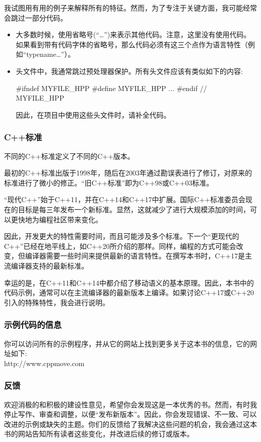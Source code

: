 我试图用有用的例子来解释所有的特征。然而，为了专注于关键方面，我可能经常会跳过一部分代码。

\begin{itemize}
\item 大多数时候，使用省略号(“…”)来表示其他代码。注意，这里没有使用代码。如果看到带有代码字体的省略号，那么代码必须有这三个点作为语言特性（例如“typename…”）。
\item 头文件中，我通常跳过预处理器保护。所有头文件应该有类似如下的内容:
\begin{cppcode}
#ifndef MYFILE_HPP
#define MYFILE_HPP
...
#endif // MYFILE_HPP
\end{cppcode}
	因此，在项目中使用这些头文件时，请补全代码。
\end{itemize}

\subsubsection{C++标准}

不同的C++标准定义了不同的C++版本。

最初的C++标准出版于1998年，随后在2003年通过勘误表进行了修订，对原来的标准进行了微小的修正。“旧C++标准”即为C++98或C++03标准。

“现代C++”始于C++11，并在C++14和C++17中扩展。国际C++标准委员会现在的目标是每三年发布一个新标准。显然，这就减少了进行大规模添加的时间，可以更快地为编程社区带来变化。

因此，开发更大的特性需要时间，而且可能涉及多个标准。下一个“更现代的C++”已经在地平线上，如C++20所介绍的那样。同样，编程的方式可能会改变，但编译器需要一些时间来提供最新的语言特性。在撰写本书时，C++17是主流编译器支持的最新标准。

幸运的是，在C++11和C++14中都介绍了移动语义的基本原理。因此，本书中的代码示例，通常可以在主流编译器的最新版本上编译。如果讨论C++17或C++20引入的特殊特性，我会进行说明。

\subsubsection{示例代码的信息}

你可以访问所有的示例程序，并从它的网站上找到更多关于这本书的信息，它的网址如下:\\http://www.cppmove.com

\subsubsection{反馈}

欢迎消极的和积极的建设性意见，希望你会发现这是一本优秀的书。然而，有时我停止写作、审查和调整，以便“发布新版本”。因此，你会发现错误、不一致、可以改进的示例或缺失的主题。你们的反馈给了我解决这些问题的机会，我会通过这本书的网站告知所有读者这些变化，并改进后续的修订或版本。

